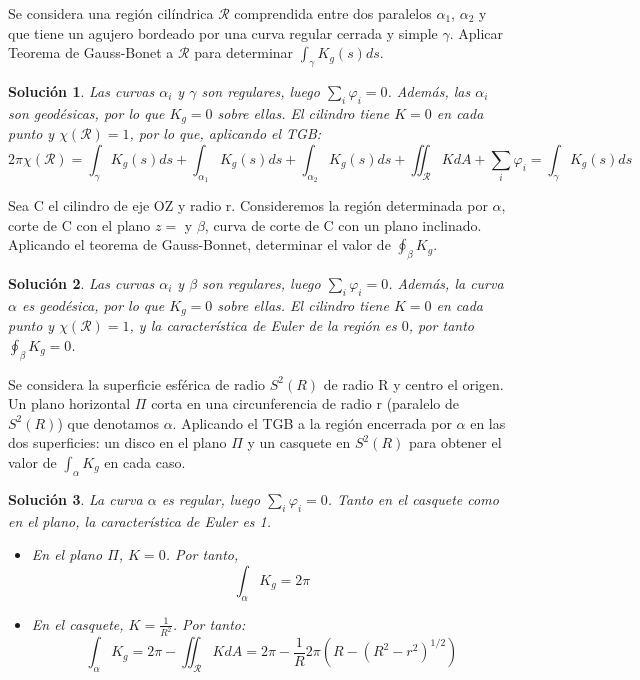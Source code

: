 \documentclass[twoside]{report}
\theoremstyle{plain}
\newtheorem*{sol*}{Solución}
\newenvironment{ejercicio}[2][Estado]{\begin{trivlist}
\item[\hskip \labelsep {\bfseries Ejercicio}\hskip \labelsep {\bfseries #2.}]}{\end{trivlist}}
\begin{document}
\newpage
\begin{ejercicio}{11} Se considera una región cilíndrica $\mathcal{R}$ comprendida entre dos paralelos $\alpha_1$, $\alpha_2$ y que tiene un agujero bordeado por una curva regular cerrada y simple $\gamma$. Aplicar Teorema de Gauss-Bonet a $\mathcal{R}$ para determinar $\int_\gamma K_g(s)ds$.
\end{ejercicio}
\begin{sol*}
Las curvas $\alpha_i$ y $\gamma$ son regulares, luego $\sum_i \varphi_i =0$. Además, las $\alpha_i$ son geodésicas, por lo que $K_g=0$ sobre ellas. El cilindro tiene $K=0$ en cada punto y $\chi(\mathcal{R})=1$, por lo que, aplicando el TGB:
\[
2\pi\chi(\mathcal{R}) = \int_\gamma K_g(s)ds + \int_{\alpha_1} K_g(s)ds + \int_{\alpha_2} K_g(s)ds+  \iint_{\mathcal{R}} KdA + \sum_i \varphi_i = \int_\gamma K_g(s)ds 
\]
\end{sol*}


\newpage
\begin{ejercicio}{13} Sea C el cilindro de eje OZ y radio r. Consideremos la región determinada por $\alpha$, corte de C con el plano $z=$ y $\beta$, curva de corte de C con un plano inclinado. Aplicando el teorema de Gauss-Bonnet, determinar el valor de $\oint_\beta K_g$.
\end{ejercicio}
\begin{sol*}
Las curvas $\alpha_i$ y $\beta$ son regulares, luego $\sum_i \varphi_i =0$. Además, la curva $\alpha$ es geodésica, por lo que $K_g=0$ sobre ellas. El cilindro tiene $K=0$ en cada punto y $\chi(\mathcal{R})=1$, y la característica de Euler de la región es $0$, por tanto $\oint_\beta K_g = 0$.
\end{sol*}

\newpage
\begin{ejercicio}{14} Se considera la superficie esférica de radio $S^2(R)$ de radio R y centro el origen. Un plano horizontal $\Pi$ corta en una circunferencia de radio r (paralelo de $S^2(R)$) que denotamos $\alpha$. Aplicando el TGB a la región encerrada por $\alpha$ en las dos superficies: un disco en el plano $\Pi$ y un casquete en $S^2(R)$ para obtener el valor de $\int_\alpha K_g$ en cada caso.
\end{ejercicio}
\begin{sol*}
La curva $\alpha$ es regular, luego $\sum_i \varphi_i =0$. Tanto en el casquete como en el plano, la característica de Euler es 1. 
\begin{itemize}
\item En el plano $\Pi$, $K=0$. Por tanto, 
\[
\int_\alpha K_g = 2\pi
\]
\item En el casquete, $K=\frac{1}{R^2}$. Por tanto:
\[
\int_\alpha K_g = 2\pi - \iint_{\mathcal{R}}K dA = 2\pi - \frac{1}{R} 2\pi(R - (R^2-r^2)^{1/2})
\]
\end{itemize}
\end{sol*}
\end{document}
